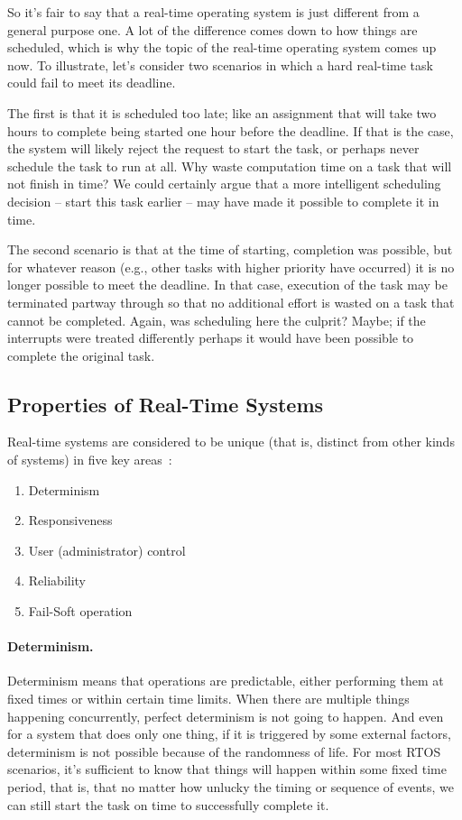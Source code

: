 So it's fair to say that a real-time operating system is just different from a general purpose one. A lot of the difference comes down to how things are scheduled, which is why the topic of the real-time operating system comes up now. To illustrate, let's consider two scenarios in which a hard real-time task could fail to meet its deadline. 

The first is that it is scheduled too late; like an assignment that will take two hours to complete being started one hour before the deadline. If that is the case, the system will likely reject the request to start the task, or perhaps never schedule the task to run at all. Why waste computation time on a task that will not finish in time? We could certainly argue that a more intelligent scheduling decision -- start this task earlier -- may have made it possible to complete it in time.

The second scenario is that at the time of starting, completion was possible, but for whatever reason (e.g., other tasks with higher priority have occurred) it is no longer possible to meet the deadline. In that case, execution of the task may be terminated partway through so that no additional effort is wasted on a task that cannot be completed. Again, was scheduling here the culprit? Maybe; if the interrupts were treated differently perhaps it would have been possible to complete the original task.

\subsection*{Properties of Real-Time Systems}
Real-time systems are considered to be unique (that is, distinct from other kinds of systems) in five key areas~\cite{osi}:

\begin{enumerate}
	\item Determinism
	\item Responsiveness
	\item User (administrator) control
	\item Reliability
	\item Fail-Soft operation
\end{enumerate}

\paragraph{Determinism.} Determinism means that operations are predictable, either performing them at fixed times or within certain time limits. When there are multiple things happening concurrently, perfect determinism is not going to happen. And even for a system that does only one thing, if it is triggered by some external factors, determinism is not possible because of the randomness of life. For most RTOS scenarios, it's sufficient to know that things will happen within some fixed time period, that is, that no matter how unlucky the timing or sequence of events, we can still start the task on time to successfully complete it.

